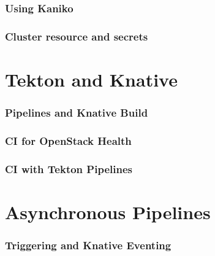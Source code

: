 \documentclass[aspectratio=169,11pt,hyperref={colorlinks=true}]{beamer}
\begin{document}
\begin{lblackrwhiteframe}
\begin{grayframe}
  \frametitle{Using Kaniko}
\end{grayframe}

\begin{grayframe}
  \frametitle{Cluster resource and secrets}
\end{grayframe}

\section{Tekton and Knative}

\begin{grayframe}
  \frametitle{Pipelines and Knative Build}
\end{grayframe}

\begin{grayframe}
  \frametitle{CI for OpenStack Health}
\end{grayframe}

\begin{grayframe}
  \frametitle{CI with Tekton Pipelines}
\end{grayframe}

\section{Asynchronous Pipelines}

\begin{grayframe}
  \frametitle{Triggering and Knative Eventing}
\end{grayframe}


\end{lblackrwhiteframe}
\end{document}
